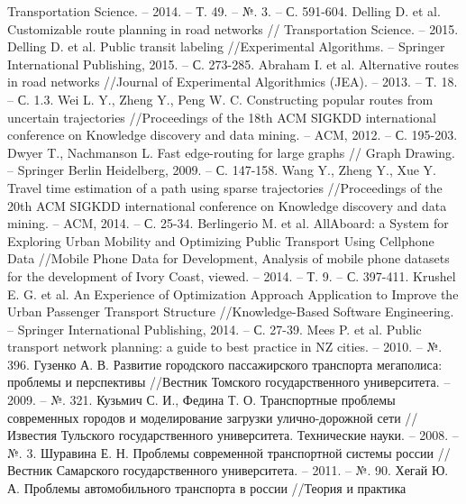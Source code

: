 \begin{thebibliography}{10}
        Transportation Science. -- 2014. -- Т. 49. -- №. 3. -- С. 591-604.
     Delling D. et al. Customizable route planning in road networks //
        Transportation Science. -- 2015.
     Delling D. et al. Public transit labeling //Experimental Algorithms. -- 
        Springer International Publishing, 2015. -- С. 273-285.
     Abraham I. et al. Alternative routes in road networks //Journal of 
        Experimental Algorithmics (JEA). -- 2013. -- Т. 18. -- С. 1.3.
     Wei L. Y., Zheng Y., Peng W. C. Constructing popular routes from 
        uncertain trajectories //Proceedings of the 18th ACM SIGKDD international conference on 
        Knowledge discovery and data mining. -- ACM, 2012. -- С. 195-203.
     Dwyer T., Nachmanson L. Fast edge-routing for large graphs //
        Graph Drawing. -- Springer Berlin Heidelberg, 2009. -- С. 147-158.
     Wang Y., Zheng Y., Xue Y. Travel time estimation of a path using sparse 
        trajectories //Proceedings of the 20th ACM SIGKDD international conference on Knowledge 
        discovery and data mining. -- ACM, 2014. -- С. 25-34.
     Berlingerio M. et al. AllAboard: a System for Exploring Urban Mobility and 
        Optimizing Public Transport Using Cellphone Data //Mobile Phone Data for Development, Analysis 
        of mobile phone datasets for the development of Ivory Coast, 
        viewed. -- 2014. -- Т. 9. -- С. 397-411.
     Krushel E. G. et al. An Experience of Optimization Approach Application to Improve 
        the Urban Passenger Transport Structure //Knowledge-Based Software Engineering. -- Springer 
        International Publishing, 2014. -- С. 27-39.
     Mees P. et al. Public transport network planning: a guide to best practice in NZ 
        cities. -- 2010. -- №. 396.
     Гузенко А. В. Развитие городского пассажирского транспорта мегаполиса: проблемы 
        и перспективы //Вестник Томского государственного университета. -- 2009. -- №. 321.
     Кузьмич С. И., Федина Т. О. Транспортные проблемы современных городов и 
        моделирование загрузки улично-дорожной сети //Известия Тульского государственного 
        университета. Технические науки. -- 2008. -- №. 3.
     Шуравина Е. Н. Проблемы современной транспортной системы россии //
        Вестник Самарского государственного университета. -- 2011. -- №. 90.
     Хегай Ю. А. Проблемы автомобильного транспорта в россии //Теория и практика 

\end{thebibliography}
